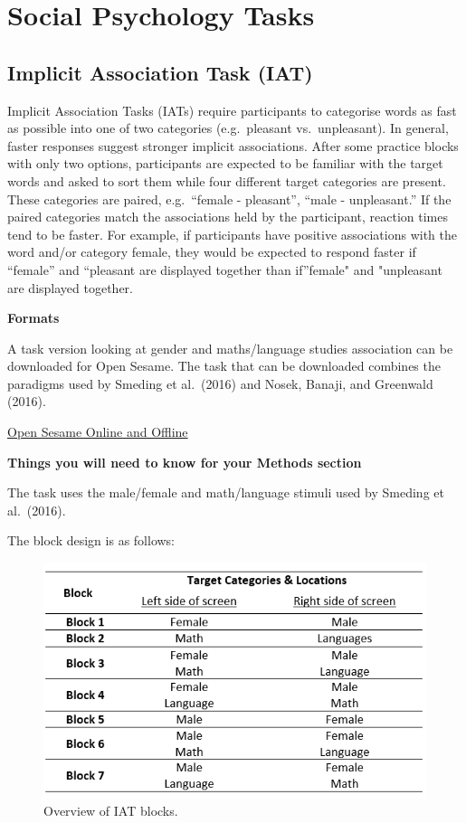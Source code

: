 \documentclass[
]{book}
\begin{document}
\hypertarget{social-psychology-tasks}{%
\chapter{Social Psychology Tasks}\label{social-psychology-tasks}}

\hypertarget{implicit-association-task-iat}{%
\section{Implicit Association Task (IAT)}\label{implicit-association-task-iat}}

Implicit Association Tasks (IATs) require participants to categorise words as fast as possible into one of two categories (e.g.~pleasant vs.~unpleasant). In general, faster responses suggest stronger implicit associations. After some practice blocks with only two options, participants are expected to be familiar with the target words and asked to sort them while four different target categories are present. These categories are paired, e.g.~``female - pleasant'', ``male - unpleasant.'' If the paired categories match the associations held by the participant, reaction times tend to be faster. For example, if participants have positive associations with the word and/or category female, they would be expected to respond faster if ``female'' and ``pleasant are displayed together than if''female" and "unpleasant are displayed together.

\textbf{Formats}

A task version looking at gender and maths/language studies association can be downloaded for Open Sesame. The task that can be downloaded combines the paradigms used by Smeding et al.~(2016) and Nosek, Banaji, and Greenwald (2016).

\href{GitHub/ImplicitAssociationTask.osexp}{Open Sesame Online and Offline}

\textbf{Things you will need to know for your Methods section}

The task uses the male/female and math/language stimuli used by Smeding et al.~(2016).

The block design is as follows:

\begin{figure}

{\centering \includegraphics[width=0.75\linewidth]{images/IAT_Design} 

}

\caption{Overview of IAT blocks.}\label{fig:Figure6-1}
\end{figure}
\end{document}
